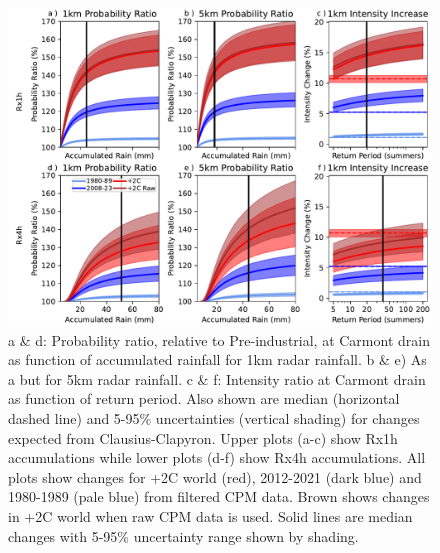 \documentclass[11pt,a4paper]{article}
\begin{document}
\clearpage
\begin{figure}[ht!]
	\centering
	\includegraphics[width=0.9\linewidth]{intens_prob_ratios}
	\caption{a \& d: Probability ratio, relative to Pre-industrial, at Carmont drain as function of accumulated rainfall for 1km radar rainfall. b \& e) As a but for 5km radar rainfall. c \& f: Intensity ratio at Carmont drain  as function of  return period. Also shown are median (horizontal dashed line) and 5-95\% uncertainties (vertical shading) for changes expected from Clausius-Clapyron. Upper plots (a-c) show Rx1h accumulations while lower plots (d-f) show Rx4h accumulations. All plots show changes for +2C world (red), 2012-2021 (dark blue) and 1980-1989 (pale blue) from filtered CPM data. Brown shows changes in +2C world when raw CPM data is used.   Solid lines are median changes with 5-95\% uncertainty range shown by  shading.}
	\label{fig:intense_prob_ratios}
\end{figure}
\clearpage
\end{document}
